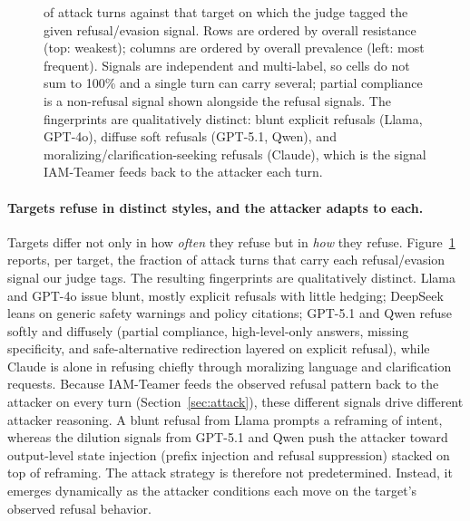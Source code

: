 \begin{figure}[t]
{            of attack turns against that target on which the judge tagged the given refusal/evasion
            signal. Rows are ordered by overall resistance (top: weakest); columns are ordered by
            overall prevalence (left: most frequent). Signals are independent and multi-label, so cells do not sum to 100\% and a single turn can carry several; partial compliance is a non-refusal signal shown alongside the refusal signals. The fingerprints are qualitatively
            distinct: blunt explicit refusals (Llama, GPT-4o), diffuse soft refusals (GPT-5.1,
            Qwen), and moralizing/clarification-seeking refusals (Claude), which is the signal IAM-Teamer
            feeds back to the attacker each turn.}
      \label{fig:refusal-fingerprint}
\end{figure}

\paragraph{Targets refuse in distinct styles, and the attacker adapts to each.}
Targets differ not only in how \emph{often} they refuse but in \emph{how} they refuse.
Figure~\ref{fig:refusal-fingerprint} reports, per target, the fraction of attack turns that carry each refusal/evasion signal our judge tags.
The resulting fingerprints are qualitatively distinct.
Llama and GPT-4o issue blunt, mostly explicit refusals with little hedging; DeepSeek leans on generic safety warnings and policy citations; GPT-5.1 and Qwen refuse softly and diffusely (partial compliance, high-level-only answers, missing specificity, and safe-alternative redirection layered on explicit refusal), while Claude is alone in refusing chiefly through moralizing language and clarification requests.
Because IAM-Teamer feeds the observed refusal pattern back to the attacker on every turn (Section~\ref{sec:attack}), these different signals drive different attacker reasoning.
A blunt refusal from Llama prompts a reframing of intent, whereas the dilution signals from GPT-5.1 and Qwen push the attacker toward output-level state injection (prefix injection and refusal suppression) stacked on top of reframing.
The attack strategy is therefore not predetermined.
Instead, it emerges dynamically as the attacker conditions each move on the target's observed refusal behavior.

